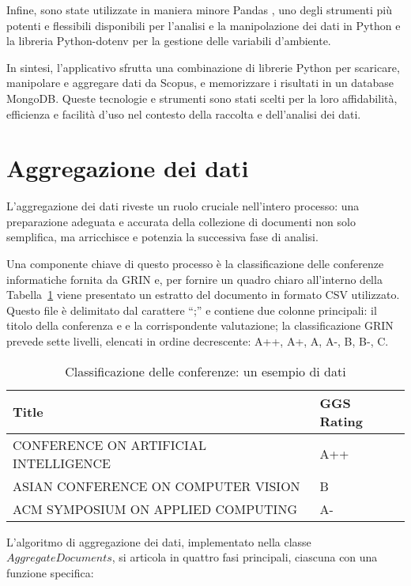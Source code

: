 Infine, sono state utilizzate in maniera minore Pandas \cite{pandas-github}, uno degli strumenti più potenti e flessibili disponibili per l'analisi e la manipolazione dei dati in Python e la libreria Python-dotenv \cite{python-dotenv-github} per la gestione delle variabili d'ambiente.

In sintesi, l'applicativo sfrutta una combinazione di librerie Python per scaricare, manipolare e aggregare dati da Scopus, e memorizzare i risultati in un database MongoDB. Queste tecnologie e strumenti sono stati scelti per la loro affidabilità, efficienza e facilità d'uso nel contesto della raccolta e dell'analisi dei dati.

\section{Aggregazione dei dati}
L'aggregazione dei dati riveste un ruolo cruciale nell'intero processo: una preparazione adeguata e accurata della collezione di documenti non solo semplifica, ma arricchisce e potenzia la successiva fase di analisi.

Una componente chiave di questo processo è la classificazione delle conferenze informatiche fornita da GRIN e, per fornire un quadro chiaro all'interno della Tabella~\ref{tab:example_conference_data} viene presentato un estratto del documento in formato CSV utilizzato. Questo file è delimitato dal carattere ``;'' e contiene due colonne principali: il titolo della conferenza e e la corrispondente valutazione; la classificazione GRIN prevede sette livelli, elencati in ordine decrescente: A++, A+, A, A-, B, B-, C.

\begin{table}[ht]
    \centering
    \begin{tabularx}{\textwidth}{|X|l|}
        \hline
        \textbf{Title} & \textbf{GGS Rating} \\
        \hline
        CONFERENCE ON ARTIFICIAL INTELLIGENCE & A++ \\
        \hline
        ASIAN CONFERENCE ON COMPUTER VISION & B \\
        \hline
        ACM SYMPOSIUM ON APPLIED COMPUTING & A- \\
        \hline
    \end{tabularx}
    \caption{Classificazione delle conferenze: un esempio di dati}
    \label{tab:example_conference_data}
\end{table}

L'algoritmo di aggregazione dei dati, implementato nella classe $AggregateDocuments$, si articola in quattro fasi principali, ciascuna con una funzione specifica:

